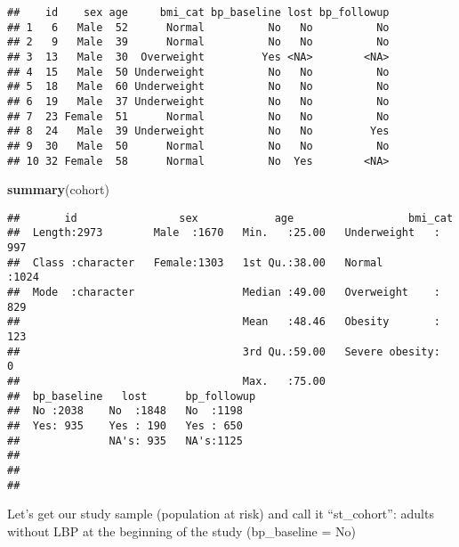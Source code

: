 \documentclass[
]{article}
\newenvironment{Shaded}{\begin{snugshade}}{\end{snugshade}}
\newcommand{\DecValTok}[1]{\textcolor[rgb]{0.00,0.00,0.81}{#1}}
\newcommand{\FunctionTok}[1]{\textcolor[rgb]{0.13,0.29,0.53}{\textbf{#1}}}
\newcommand{\NormalTok}[1]{#1}
\newcommand{\OtherTok}[1]{\textcolor[rgb]{0.56,0.35,0.01}{#1}}
\newcommand{\SpecialCharTok}[1]{\textcolor[rgb]{0.81,0.36,0.00}{\textbf{#1}}}
\newcommand{\StringTok}[1]{\textcolor[rgb]{0.31,0.60,0.02}{#1}}
\begin{document}
\begin{verbatim}
##    id    sex age     bmi_cat bp_baseline lost bp_followup
## 1   6   Male  52      Normal          No   No          No
## 2   9   Male  39      Normal          No   No          No
## 3  13   Male  30  Overweight         Yes <NA>        <NA>
## 4  15   Male  50 Underweight          No   No          No
## 5  18   Male  60 Underweight          No   No          No
## 6  19   Male  37 Underweight          No   No          No
## 7  23 Female  51      Normal          No   No          No
## 8  24   Male  39 Underweight          No   No         Yes
## 9  30   Male  50      Normal          No   No          No
## 10 32 Female  58      Normal          No  Yes        <NA>
\end{verbatim}

\begin{Shaded}
\begin{Highlighting}[]
\FunctionTok{summary}\NormalTok{(cohort)}
\end{Highlighting}
\end{Shaded}

\begin{verbatim}
##       id                sex            age                  bmi_cat    
##  Length:2973        Male  :1670   Min.   :25.00   Underweight   : 997  
##  Class :character   Female:1303   1st Qu.:38.00   Normal        :1024  
##  Mode  :character                 Median :49.00   Overweight    : 829  
##                                   Mean   :48.46   Obesity       : 123  
##                                   3rd Qu.:59.00   Severe obesity:   0  
##                                   Max.   :75.00                        
##  bp_baseline   lost      bp_followup
##  No :2038    No  :1848   No  :1198  
##  Yes: 935    Yes : 190   Yes : 650  
##              NA's: 935   NA's:1125  
##                                     
##                                     
## 
\end{verbatim}

Let's get our study sample (population at risk) and call it
``st\_cohort'': adults without LBP at the beginning of the study
(bp\_baseline = No)

\begin{Shaded}
\end{Shaded}
\end{document}
